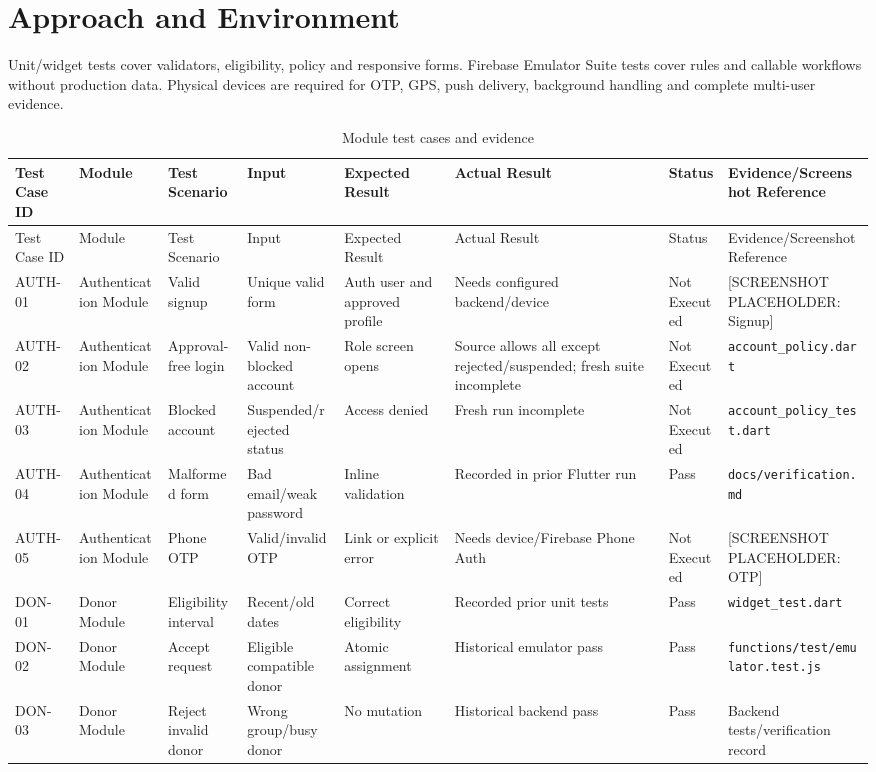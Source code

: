 \section{Approach and Environment}
Unit/widget tests cover validators, eligibility, policy and responsive forms. Firebase Emulator Suite tests cover rules and callable workflows without production data. Physical devices are required for OTP, GPS, push delivery, background handling and complete multi-user evidence.
\begin{landscape}\scriptsize
\begin{longtable}{p{1.2cm}p{2.2cm}p{3cm}p{2.5cm}p{3.3cm}p{3.2cm}p{1.6cm}p{3cm}}
\caption{Module test cases and evidence}\label{tab:testcases}\\
\toprule Test Case ID&Module&Test Scenario&Input&Expected Result&Actual Result&Status&Evidence/Screenshot Reference\\\midrule\endfirsthead
\toprule Test Case ID&Module&Test Scenario&Input&Expected Result&Actual Result&Status&Evidence/Screenshot Reference\\\midrule\endhead
AUTH-01&Authentication Module&Valid signup&Unique valid form&Auth user and approved profile&Needs configured backend/device&Not Executed&[SCREENSHOT PLACEHOLDER: Signup]\\
AUTH-02&Authentication Module&Approval-free login&Valid non-blocked account&Role screen opens&Source allows all except rejected/suspended; fresh suite incomplete&Not Executed&\texttt{account\_policy.dart}\\
AUTH-03&Authentication Module&Blocked account&Suspended/rejected status&Access denied&Fresh run incomplete&Not Executed&\texttt{account\_policy\_test.dart}\\
AUTH-04&Authentication Module&Malformed form&Bad email/weak password&Inline validation&Recorded in prior Flutter run&Pass&\texttt{docs/verification.md}\\
AUTH-05&Authentication Module&Phone OTP&Valid/invalid OTP&Link or explicit error&Needs device/Firebase Phone Auth&Not Executed&[SCREENSHOT PLACEHOLDER: OTP]\\
DON-01&Donor Module&Eligibility interval&Recent/old dates&Correct eligibility&Recorded prior unit tests&Pass&\texttt{widget\_test.dart}\\
DON-02&Donor Module&Accept request&Eligible compatible donor&Atomic assignment&Historical emulator pass&Pass&\texttt{functions/test/emulator.test.js}\\
DON-03&Donor Module&Reject invalid donor&Wrong group/busy donor&No mutation&Historical backend pass&Pass&Backend tests/verification record\\

\end{longtable}
\end{landscape}
